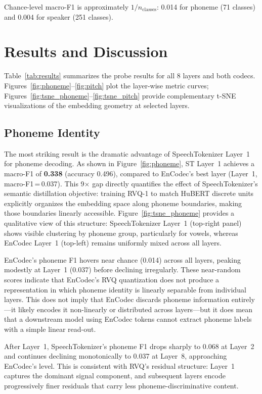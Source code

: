\documentclass[10pt,twocolumn]{article}
\begin{document}
Chance-level macro-F1 is approximately $1/n_\text{classes}$: 0.014 for
phoneme (71 classes) and 0.004 for speaker (251 classes).

\section{Results and Discussion}

Table~\ref{tab:results} summarizes the probe results for all 8 layers
and both codecs. Figures~\ref{fig:phoneme}--\ref{fig:pitch} plot the
layer-wise metric curves; Figures~\ref{fig:tsne_phoneme}--\ref{fig:tsne_pitch}
provide complementary t-SNE visualizations of the embedding geometry at
selected layers.

\subsection{Phoneme Identity}

The most striking result is the dramatic advantage of SpeechTokenizer
Layer~1 for phoneme decoding. As shown in Figure~\ref{fig:phoneme}, ST
Layer~1 achieves a macro-F1 of \textbf{0.338} (accuracy 0.496),
compared to EnCodec's best layer (Layer~1, macro-F1\,=\,0.037). This
9$\times$ gap directly quantifies the effect of SpeechTokenizer's
semantic distillation objective: training RVQ-1 to match HuBERT
discrete units explicitly organizes the embedding space along phoneme
boundaries, making those boundaries linearly accessible.
Figure~\ref{fig:tsne_phoneme} provides a qualitative view of this
structure: SpeechTokenizer Layer~1 (top-right panel) shows visible
clustering by phoneme group, particularly for vowels, whereas EnCodec
Layer~1 (top-left) remains uniformly mixed across all layers.

EnCodec's phoneme F1 hovers near chance (0.014) across all layers,
peaking modestly at Layer~1 (0.037) before declining irregularly.
These near-random scores indicate that EnCodec's RVQ quantization does
not produce a representation in which phoneme identity is linearly
separable from individual layers. This does not imply that EnCodec
discards phoneme information entirely---it likely encodes it
non-linearly or distributed across layers---but it does mean that a
downstream model using EnCodec tokens cannot extract phoneme labels
with a simple linear read-out.

After Layer~1, SpeechTokenizer's phoneme F1 drops sharply to 0.068 at
Layer~2 and continues declining monotonically to 0.037 at Layer~8,
approaching EnCodec's level. This is consistent with RVQ's residual
structure: Layer~1 captures the dominant signal component, and
subsequent layers encode progressively finer residuals that carry less
phoneme-discriminative content.
\end{document}
